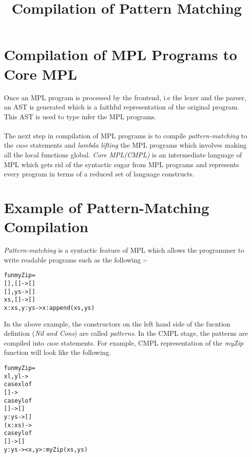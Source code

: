 \documentclass[11pt]{article}
\title{Compilation of Pattern Matching}
\begin{document}
\maketitle
\section {Compilation of MPL Programs to Core MPL}

Once an MPL program is processed by the frontend, i.e the lexer and the parser, an AST is generated which is a faithful representation of the original program. This AST is used to type infer the MPL programs.
~~\\~~\\ 
The next step in compilation of MPL programs is to compile {\em pattern-matching} to the {\em case} statements and {\em lambda lifting} the MPL programs which involves making all the local functions global. {\em Core MPL(CMPL)} is an intermediate language of MPL which gets rid of the syntactic sugar from MPL programs and represents every program in terms of a reduced set of language constructs.

\section {Example of Pattern-Matching Compilation} \label {ExPattMatch}
{\em Pattern-matching} is a syntactic feature of MPL which allows the programmer to write readable programs such as the following :- 
\begin{alltt}
fun myZip = 
     [],   []   -> [] 
     [],   ys   -> []
     xs,   []   -> []
     x:xs, y:ys -> x:append (xs,ys) 
\end{alltt}
In the above example, the constructors on the left hand side of the fucntion 
defintion ({\em Nil and Cons}) are called {\em patterns}. In the CMPL stage, the patterns are compiled into {\em case} statements. For example, CMPL representation of the {\em myZip} function will look like the following.
\begin{alltt}
fun myZip =
    xl,yl -> 
        case xl of
          [] -> 
            case yl of  
               []   -> []
               y:ys -> [] 
          (x:xs) -> 
            case yl of 
              []   -> []
              y:ys -> <x,y>:myZip (xs,ys)

\end{alltt}
\end{document}
